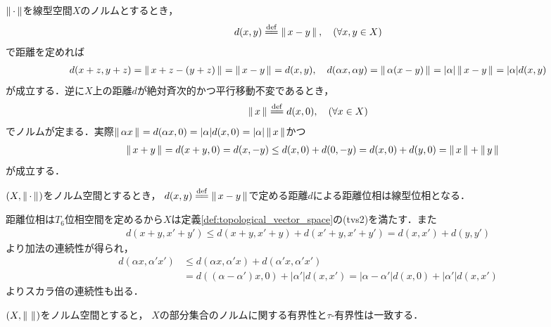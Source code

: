 	\begin{prf}
		$\left\|\, \cdot\, \right\|_{}$を線型空間$X$のノルムとするとき，
		\begin{align}
			d(x,y) \defeq \Norm{x-y}{}, \quad (\forall x,y \in X)
		\end{align}
		で距離を定めれば
		\begin{align}
			d(x+z,y+z) = \left\|\, x+z-(y+z)\, \right\|_{} = \left\|\, x-y\, \right\|_{} = d(x,y),
			\quad d(\alpha x, \alpha y)
			= \left\|\, \alpha (x-y)\, \right\|_{} = |\alpha|\left\|\, x-y\, \right\|_{} = |\alpha|d(x,y)
		\end{align}
		が成立する．逆に$X$上の距離$d$が絶対斉次的かつ平行移動不変であるとき，
		\begin{align}
			\Norm{x}{} \defeq d(x,0),\quad (\forall x \in X)
		\end{align}
		でノルムが定まる．実際$\left\|\, \alpha x\, \right\|_{} = d(\alpha x,0) 
		= |\alpha|d(x,0) = |\alpha|\left\|\, x\, \right\|_{}$かつ
		\begin{align}
			\quad \left\|\, x+y\, \right\|_{} = d(x+y,0) = d(x,-y) 
			\leq d(x,0) + d(0,-y) = d(x,0) + d(y,0) = \left\|\, x\, \right\|_{} + \left\|\, y\, \right\|_{}
		\end{align}
		が成立する．
		\QED
	\end{prf}
	
	\begin{screen}
		\begin{thm}[ノルムで導入する距離位相は線型位相]
			$(X,\left\|\, \cdot\, \right\|_{})$をノルム空間とするとき，
			$d(x,y) \defeq \Norm{x-y}{}$で定める距離$d$による距離位相は線型位相となる．
		\end{thm}
	\end{screen}
	
	\begin{prf}
		距離位相は$T_6$位相空間を定めるから$X$は定義\ref{def:topological_vector_space}の(tvs2)を満たす．また
		\begin{align}
			d(x+y,x'+y') \leq d(x+y,x'+y) + d(x'+y,x'+y') = d(x,x') + d(y,y')
		\end{align}
		より加法の連続性が得られ，
		\begin{align}
			d(\alpha x, \alpha'x') &\leq d(\alpha x, \alpha'x) + d(\alpha'x,\alpha'x') \\
			&= d((\alpha - \alpha') x, 0) + |\alpha'|d(x,x')
			= |\alpha-\alpha'|d(x,0) + |\alpha'|d(x,x')
		\end{align}
		よりスカラ倍の連続性も出る．
		\QED
	\end{prf}
	
	\begin{screen}
		\begin{thm}[ノルム空間において距離的な有界性と位相的な有界性は一致する]
			$(X,\left\|\, \, \right\|_{})$をノルム空間とすると，
			$X$の部分集合のノルムに関する有界性と$\tau$-有界性は一致する．
		\end{thm}
	\end{screen}
	
